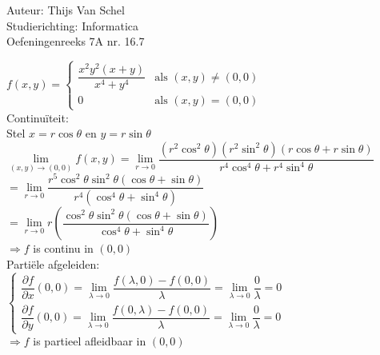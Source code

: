 \documentclass[a4paper]{article}
\newcommand{\dlim}{\lim\limits}
\begin{document}
  
\noindent \large Auteur: Thijs Van Schel \\
\noindent \large Studierichting: Informatica\\
\noindent \large Oefeningenreeks 7A nr. 16.7\\

\medskip

\normalsize

$f(x,y) = 
\left\{ 
\begin{array}{ll} 
\dfrac{x^2y^2(x+y)}{x^4+y^4} & \text{als } (x,y) \neq (0,0)\\ 
0 & \text{als } (x,y) = (0,0) 
\end{array} 
\right.$ \\

Continuïteit:\\

Stel $x = r\cos\theta$ en $y = r \sin \theta$\\

$\dlim_{(x,y)\rightarrow (0,0)} f(x,y) = \dlim_{r\rightarrow 0} \dfrac{(r^2 \cos^2 \theta)(r^2 \sin^2 \theta)(r\cos\theta + r\sin\theta)}{r^4 \cos^4 \theta + r^4 \sin^4 \theta}$\\

$= \dlim_{r\rightarrow 0} \dfrac{r^5 \cos^2 \theta \sin^2 \theta (\cos\theta + \sin\theta)}{r^4 (\cos^4 \theta + \sin^4 \theta)}$\\

$= \dlim_{r\rightarrow 0} r \left( \dfrac{\cos^2 \theta \sin^2 \theta (\cos\theta + \sin\theta)}{\cos^4 \theta + \sin^4 \theta} \right)$\\

$\Rightarrow f$ is continu in $(0,0)$ \\

Partiële afgeleiden:\\

$\left\{ 
\begin{array}{l} 
\dfrac{\partial f}{\partial x}(0,0) = \dlim_{\lambda \rightarrow 0} \dfrac{f(\lambda,0) - f(0,0)}{\lambda} = \dlim_{\lambda \rightarrow 0} \dfrac{0}{\lambda} = 0 \\ 
\dfrac{\partial f}{\partial y}(0,0) = \dlim_{\lambda \rightarrow 0} \dfrac{f(0,\lambda) - f(0,0)}{\lambda} = \dlim_{\lambda \rightarrow 0} \dfrac{0}{\lambda} = 0 
\end{array} 
\right.$ \\

$\Rightarrow f$ is partieel afleidbaar in $(0,0)$\\
\end{document}
